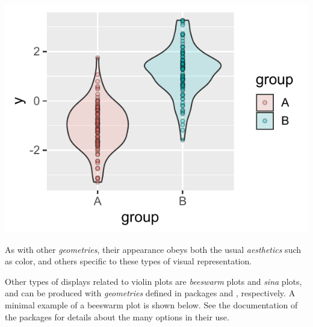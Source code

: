 \documentclass[krantz2]{krantz}\usepackage{knitr}
\begin{document}
\begin{knitrout}\footnotesize
{}\color{fgcolor}\begin{kframe}
\begin{alltt}
    \hlopt{+}
  \hlstd{(} \hlstd{=} \hlstd{)} \hlopt{+}
  \hlstd{(} \hlstd{=} \hlstd{,}  \hlstd{=} \hlstd{,}
              \hlstd{=} \hlstd{,}  \hlstd{=} \hlstd{)}
\end{alltt}
\end{kframe}

{\centering \includegraphics[width=.54\textwidth]{figure/pos-violin-plot-02-1} 

}


\end{knitrout}

As with other \emph{geometries}, their appearance obeys both the usual \emph{aesthetics} such as color, and others specific to these types of visual representation.

Other types of displays related to violin plots are \emph{beeswarm} plots and \emph{sina} plots, and can be produced with \emph{geometries} defined in packages  and , respectively. A minimal example of a beeswarm plot is shown below. See the documentation of the packages for details about the many options in their use.
\end{document}
